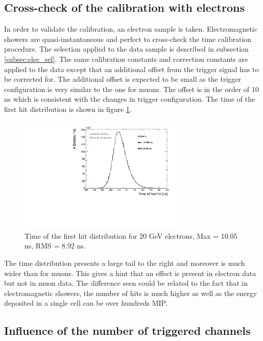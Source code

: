 \documentclass[twoside,a4paper,11pt]{article}
\begin{document}
\subsection{Cross-check of the calibration with electrons}
\label{subsec:validation}

In order to validate the calibration, an electron sample is taken. Electromagnetic showers are quasi-instantaneous and perfect to cross-check the time calibration procedure. The selection applied to the data sample is described in subsection \ref{subsec:elec_sel}. The same calibration constants and correction constants are applied to the data except that an additional offset from the trigger signal has to be corrected for. The additional offset is expected to be small as the trigger configuration is very similar to the one for muons. The offset is in the order of 10 ns which is consistent with the changes in trigger configuration. The time of the first hit distribution is shown in figure \ref{fig:Timing_electrons}.
\begin{figure}[htbp]
\begin{center}
\includegraphics[width=0.7\textwidth]{fig/Electrons/Timing_AllLayers_AfterMuons.pdf}
\caption{Time of the first hit distribution for 20 GeV electrons, Max = 10.05 ns, RMS = 8.92 ns.}
\label{fig:Timing_electrons}
\end{center}
\end{figure}
The time distribution presents a large tail to the right and moreover is much wider than for muons. This gives a hint that an effect is present in electron data but not in muon data. The difference seen could be related to the fact that in electromagnetic showers, the number of hits is much higher as well as the energy deposited in a single cell can be over hundreds MIP.

\subsection{Influence of the number of triggered channels}
\label{subsec:ped_shift}
\end{document}
